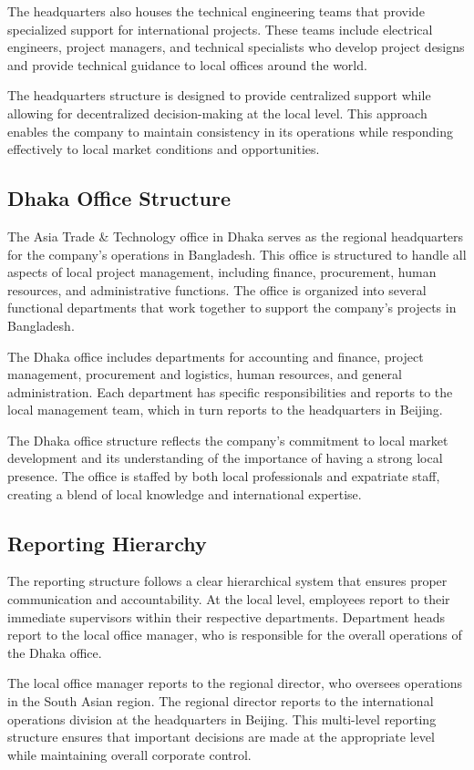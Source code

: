 The headquarters also houses the technical engineering teams that provide specialized support for international projects. These teams include electrical engineers, project managers, and technical specialists who develop project designs and provide technical guidance to local offices around the world.

The headquarters structure is designed to provide centralized support while allowing for decentralized decision-making at the local level. This approach enables the company to maintain consistency in its operations while responding effectively to local market conditions and opportunities.

\subsection{Dhaka Office Structure}
The Asia Trade \& Technology office in Dhaka serves as the regional headquarters for the company's operations in Bangladesh. This office is structured to handle all aspects of local project management, including finance, procurement, human resources, and administrative functions. The office is organized into several functional departments that work together to support the company's projects in Bangladesh.

The Dhaka office includes departments for accounting and finance, project management, procurement and logistics, human resources, and general administration. Each department has specific responsibilities and reports to the local management team, which in turn reports to the headquarters in Beijing.

The Dhaka office structure reflects the company's commitment to local market development and its understanding of the importance of having a strong local presence. The office is staffed by both local professionals and expatriate staff, creating a blend of local knowledge and international expertise.

\subsection{Reporting Hierarchy}
The reporting structure follows a clear hierarchical system that ensures proper communication and accountability. At the local level, employees report to their immediate supervisors within their respective departments. Department heads report to the local office manager, who is responsible for the overall operations of the Dhaka office.

The local office manager reports to the regional director, who oversees operations in the South Asian region. The regional director reports to the international operations division at the headquarters in Beijing. This multi-level reporting structure ensures that important decisions are made at the appropriate level while maintaining overall corporate control.

